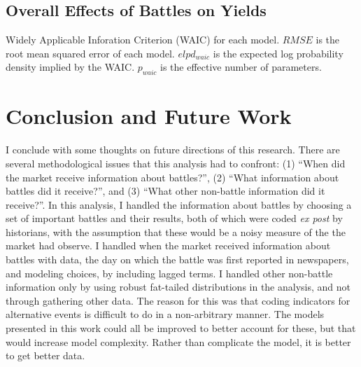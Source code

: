 \subsection{Overall Effects of Battles on Yields}
\label{sec:over-effects-battl}


\begin{table}[!htpb]
  \centering
  
  \caption{Widely Applicable Inforation Criterion (WAIC) for each model.
    $RMSE$ is the root mean squared error of each model.
    $elpd_{waic}$ is the expected log probability density implied by the WAIC.
    $p_{waic}$ is the effective number of parameters.
  }
  \label{bonds:tab:waic}
\end{table}




\section{Conclusion and Future Work}
\label{sec:conclusion}


I conclude with some thoughts on future directions of this research.
There are several methodological issues that this analysis had to confront: (1) ``When did the market receive information about battles?'', (2) ``What information about battles did it receive?'', and (3) ``What other non-battle information did it receive?''.
In this analysis, I handled the information about battles by choosing a set of important battles and their results, both of which were coded \textit{ex post} by historians,  with the assumption that these would be a noisy measure of the the market had observe.
I handled when the market received information about battles with data, the day on which the battle was first reported in newspapers, and modeling choices, by including lagged terms.
I handled other non-battle information only by using robust fat-tailed distributions in the analysis, and not through gathering other data.
The reason for this was that coding indicators for alternative events is difficult to do in a non-arbitrary manner.
The models presented in this work could all be improved to better account for these, but that would increase model complexity.
Rather than complicate the model, it is better to get better data.

